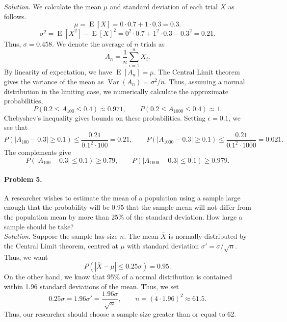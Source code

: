 \documentclass[10pt]{article}
\newcommand\var[1]{\operatorname{Var}(#1)}
\newcommand\E[1]{\operatorname{E}[#1]}
\begin{document}
        \textit{Solution.} We calculate the mean $\mu$ and standard deviation of each trial $X$ as follows.
        \[
                \mu = \E{X} = 0\cdot 0.7 + 1\cdot 0.3 = 0.3.
        \]
        \[
                \sigma^2 = \E{X^2} - \E{X}^2 = 0^2\cdot 0.7 + 1^2\cdot 0.3 - 0.3^2 = 0.21.
        \]
        Thus, $\sigma = 0.458$.
        We denote the average of $n$ trials as
        \[
                A_n = \frac{1}{n}\sum_{i = 1}^n X_i.
        \]
        By linearity of expectation, we have $\E{A_n} = \mu$. The Central Limit theorem gives the variance of the mean as $\var{A_n} = \sigma^2 /n$.
        Thus, assuming a normal distribution in the limiting case, we numerically calculate the approximate probabilities,
        \[
                P(0.2 \leq A_{100} \leq 0.4) \approx 0.971, \qquad
                P(0.2 \leq A_{1000} \leq 0.4) \approx 1.
        \]
        Chebyshev's inequality gives bounds on these probabilities. Setting $\epsilon = 0.1$, we see that
        \[
                P(|A_{100} - 0.3| \geq 0.1) \leq \frac{0.21}{0.1^2\cdot 100} = 0.21, \qquad
                P(|A_{1000} - 0.3| \geq 0.1) \leq \frac{0.21}{0.1^2\cdot 1000} = 0.021.
        \]
        The complements give
        \[
                P(|A_{100} - 0.3| \leq 0.1) \geq 0.79, \qquad
                P(|A_{1000} - 0.3| \leq 0.1) \geq 0.979.
        \]

        \paragraph{Problem 5.} A researcher wishes to estimate the mean of a population using a sample large enough that the probability will be 
        0.95 that the sample mean will not differ from the population mean by more than 25\% of the standard deviation.
        How large a sample should he take? \\

        \textit{Solution.} Suppose the sample has size $n$. The mean $\overline{X}$ is normally distributed by the Central Limit theorem,
        centred at $\mu$ with standard deviation $\sigma' = \sigma / \sqrt{n}$. Thus, we want
        \[
                P(|\overline{X} - \mu| \leq 0.25\sigma) = 0.95.
        \]
        On the other hand, we know that 95\% of a normal distribution is contained within 1.96 standard deviations of the mean. Thus,
        we set 
        \[
                0.25\sigma = 1.96\sigma' = \frac{1.96\sigma}{\sqrt{n}}, \qquad n = (4\cdot 1.96)^2 \approx 61.5.
        \]
        Thus, our researcher should choose a sample size greater than or equal to 62.
\end{document}
